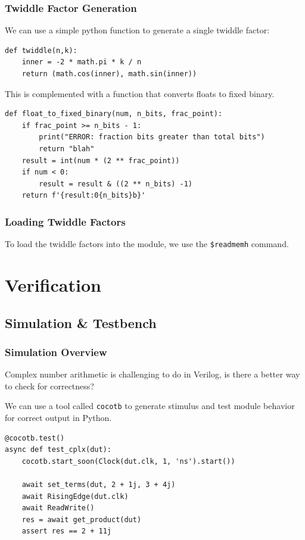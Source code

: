 \documentclass{beamer}
\begin{document}
\begin{frame}[fragile]
	\frametitle{Twiddle Factor Generation}
	We can use a simple python function to generate a single twiddle factor:
\begin{verbatim}
def twiddle(n,k):
    inner = -2 * math.pi * k / n
    return (math.cos(inner), math.sin(inner))
\end{verbatim}
This is complemented with a function that converts floats to fixed binary.
\begin{verbatim}
def float_to_fixed_binary(num, n_bits, frac_point):
    if frac_point >= n_bits - 1:
        print("ERROR: fraction bits greater than total bits")
        return "blah"
    result = int(num * (2 ** frac_point))
    if num < 0:
        result = result & ((2 ** n_bits) -1)
    return f'{result:0{n_bits}b}'
\end{verbatim}
\end{frame}

\begin{frame}
	\frametitle{Loading Twiddle Factors}
	To load the twiddle factors into the module, we use the \texttt{\$readmemh}
	command.
	

\end{frame}

\section{Verification}

\subsection{Simulation \& Testbench}
\begin{frame}[fragile]
	\frametitle{Simulation Overview}
	Complex number arithmetic is challenging to do in Verilog, is there a better way
	to check for correctness?

	\pause
	 We can use a tool called \texttt{cocotb} to generate stimulus and
	test module behavior for correct output in Python.

	\pause
\begin{verbatim}
@cocotb.test()
async def test_cplx(dut):
    cocotb.start_soon(Clock(dut.clk, 1, 'ns').start())

    await set_terms(dut, 2 + 1j, 3 + 4j)
    await RisingEdge(dut.clk)
    await ReadWrite()
    res = await get_product(dut)
    assert res == 2 + 11j
\end{verbatim}
\end{frame}
\end{document}
